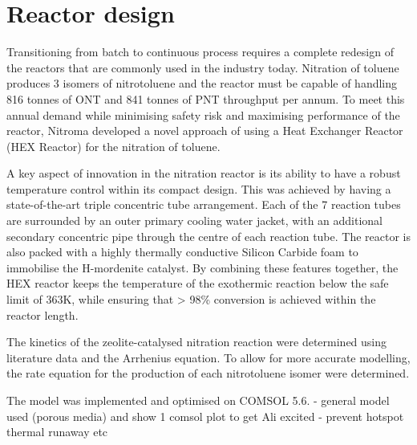 \section*{Reactor design}
Transitioning from batch to continuous process requires a complete redesign of the reactors that are commonly used in the industry today. Nitration of toluene produces 3 isomers of nitrotoluene and the reactor must be capable of handling 816 tonnes of ONT and 841 tonnes of PNT throughput per annum. To meet this annual demand while minimising safety risk and maximising performance of the reactor, Nitroma developed a novel approach of using a Heat Exchanger Reactor (HEX Reactor) for the nitration of toluene.


A key aspect of innovation in the nitration reactor is its ability to have a robust temperature control within its compact design. This was achieved by having a state-of-the-art triple concentric tube arrangement. Each of the 7 reaction tubes are surrounded by an outer primary cooling water jacket, with an additional secondary concentric pipe through the centre of each reaction tube. The reactor is also packed with a highly thermally conductive Silicon Carbide foam to immobilise the H-mordenite catalyst. By combining these features together, the HEX reactor keeps the temperature of the exothermic reaction below the safe limit of 363K, while ensuring that > 98\% conversion is achieved within the reactor length.

The kinetics of the zeolite-catalysed nitration reaction were determined using literature data and the Arrhenius equation. To allow for more accurate modelling, the rate equation for the production of each nitrotoluene isomer were determined. 

The model was implemented and optimised on COMSOL 5.6. 
- general model used (porous media) and show 1 comsol plot to get Ali excited
- prevent hotspot thermal runaway etc

